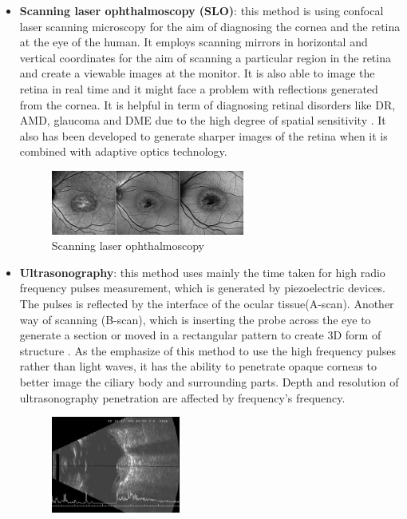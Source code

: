 \begin{itemize}
\item \textbf{Scanning laser ophthalmoscopy (SLO)}: this method is using confocal laser scanning microscopy for the aim of diagnosing the cornea and the retina at the eye of the human.
It employs scanning mirrors in horizontal and vertical coordinates for the aim of scanning a particular region in the retina and create a viewable images at the monitor.
It is also able to image the retina in real time and it might face a problem with reflections generated from the cornea.
It is helpful in term of diagnosing retinal disorders like DR, AMD, glaucoma and DME due to the high degree of spatial sensitivity \cite{gray2008vivo}.
It also has been developed to generate sharper images of the retina when it is combined with adaptive optics technology.
\begin{figure}[htb]
        \centering
        \includegraphics[width=0.6\textwidth]{figures/SLO.jpg} %
  \caption{Scanning laser ophthalmoscopy \cite{SF2016}}
  \label{fig:Glaucoma}
\end{figure} 
\item \textbf{Ultrasonography}: this method uses mainly the time taken for high radio frequency pulses measurement, which is generated by piezoelectric devices.
The pulses is reflected by the interface of the ocular tissue(A-scan).
Another way of scanning (B-scan), which is inserting the probe across the eye to generate a section or moved in a rectangular pattern to create 3D form of structure \cite{cusumano1998three}.
As the emphasize of this method to use the high frequency pulses rather than light waves, it has the ability to penetrate opaque corneas to better image the ciliary body and surrounding parts.
Depth and resolution of ultrasonography penetration are affected by frequency's frequency.
\begin{figure}[htb]
        \centering
        \includegraphics[width=0.4\textwidth]{figures/Ocularultra.jpg} %

\end{figure}
\end{itemize}
